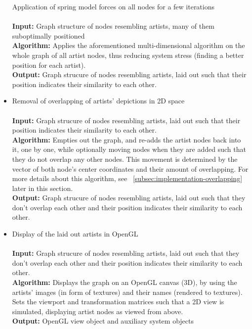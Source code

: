 \begin{itemize}
		\subitem Application of spring model forces on all nodes for a few iterations \\\\
				\textbf{Input:} Graph structure of nodes resembling artists, many of them suboptimally positioned \\
				\textbf{Algorithm:} Applies the aforementioned multi-dimensional algorithm on the whole graph of
				all artist nodes, thus reducing system stress (finding a better position for each artist).  \\
				\textbf{Output:} Graph strucure of nodes resembling artists, laid out such that their position 
				indicates their similarity to each other.\\
				
	\item Removal of overlapping of artists' depictions in 2D space	\\\\
				\textbf{Input:} Graph strucure of nodes resembling artists, laid out such that their position 
				indicates their similarity to each other. \\
				\textbf{Algorithm:} Empties out the graph, and re-adds the artist nodes back into it, one by one,
				while optionally moving nodes when they are added such that they do not overlap any other nodes. This
				movement is determined by the vector of both node's center coordinates and their amount
				of overlapping. For more details about this algorithm, see 
				~\ref{subsec:implementation-overlapping} later in this section. \\
				\textbf{Output:} Graph strucure of nodes resembling artists, laid out such that they don't 
				overlap each other and their position indicates their similarity to each other. \\
				
	\item Display of the laid out artists in OpenGL	\\\\
				\textbf{Input:} Graph strucure of nodes resembling artists, laid out such that they don't 
				overlap each other and their position indicates their similarity to each other. \\
				\textbf{Algorithm:} Displays the graph on an OpenGL canvas (3D), by using the artists' images (in form
				of textures) and their names (rendered to textures). Sets the viewport and transformation
				matrices such that a 2D view is simulated, displaying artist nodes as viewed from above. \\
				\textbf{Output:} OpenGL view object and auxiliary system objects \\
				

\end{itemize}
